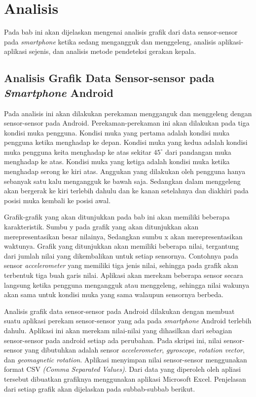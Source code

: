 \chapter{Analisis}
\label{chap:analisis}

Pada bab ini akan dijelaskan mengenai analisis grafik dari data sensor-sensor pada \textit{smartphone} ketika sedang mengangguk dan menggeleng, analisis aplikasi-aplikasi sejenis, dan analisis metode pendeteksi gerakan kepala. 

\section{Analisis Grafik Data Sensor-sensor pada \textit{Smartphone} Android }
\label{sec:analisis_grafik_data}

Pada analisis ini akan dilakukan perekaman mengganguk dan menggeleng dengan sensor-sensor pada Android. Perekaman-perekaman ini akan dilakukan pada tiga kondisi muka pengguna. Kondisi muka yang pertama adalah kondisi muka pengguna ketika menghadap ke depan. Kondisi muka yang kedua adalah kondisi muka pengguna keita menghadap ke atas sekitar $45^{\circ}$ dari pandangan muka menghadap ke atas. Kondisi muka yang ketiga adalah kondisi muka ketika menghadap serong ke kiri atas. Anggukan yang dilakukan oleh pengguna hanya sebanyak satu kalu mengangguk ke bawah saja. Sedangkan dalam menggeleng akan bergerak ke kiri terlebih dahulu dan ke kanan setelahnya dan diakhiri pada posisi muka kembali ke posisi awal.

Grafik-grafik yang akan ditunjukkan pada bab ini akan memiliki beberapa karakteristik. Sumbu y pada grafik yang akan ditunjukkan akan merepresentasikan besar nilainya, Sedangkan sumbu x akan merepresentasikan waktunya. Grafik yang ditunjukkan akan memiliki beberapa nilai, tergantung dari jumlah nilai yang dikembalikan untuk setiap sensornya. Contohnya pada sensor \textit{accelerometer} yang memiliki tiga jenis nilai, sehingga pada grafik akan terbentuk tiga buah garis nilai. Aplikasi akan merekam beberapa sensor secara langsung ketika pengguna mengangguk atau menggeleng, sehingga nilai wakunya akan sama untuk kondisi muka yang sama walaupun sensornya berbeda.

Analisis grafik data sensor-sensor pada Android dilakukan dengan membuat suatu aplikasi perekam sensor-sensor yang ada pada \textit{smartphone} Android terlebih dahulu. Aplikasi ini akan merekam nilai-nilai yang dihasilkan dari sebagian sensor-sensor pada android setiap ada perubahan. Pada skripsi ini, nilai sensor-sensor yang dibutuhkan adalah sensor \textit{accelerometer}, \textit{gyroscope}, \textit{rotation vector}, dan \textit{geomagnetic rotation}. Aplikasi menyimpan nilai sensor-sensor menggunakan format CSV \textit{(Comma Separated Values)}. Dari data yang diperoleh oleh apliasi tersebut dibuatkan grafiknya menggunakan aplikasi Microsoft Excel. Penjelasan dari setiap grafik akan dijelaskan pada subbab-subbab berikut.
